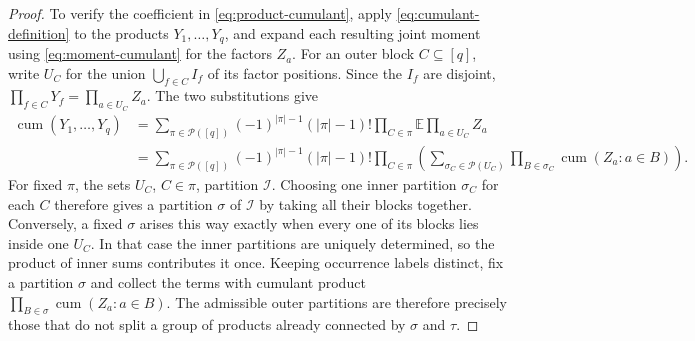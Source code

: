 \documentclass[11pt]{article}
\theoremstyle{definition}
\theoremstyle{remark}
\theoremstyle{plain}
\newcommand{\E}{\mathbb E}
\DeclareMathOperator{\cum}{cum}
\begin{document}
\begin{proof}
To verify the coefficient in
\eqref{eq:product-cumulant}, apply \eqref{eq:cumulant-definition}
to the products $Y_1,\ldots,Y_q$, and expand each resulting joint
moment using \eqref{eq:moment-cumulant} for the factors $Z_a$.
For an outer block $C\subseteq[q]$, write $U_C$ for the union
$\bigcup_{f\in C}I_f$ of its factor positions. Since the $I_f$
are disjoint, $\prod_{f\in C}Y_f=\prod_{a\in U_C}Z_a$.
The two substitutions give
\[
\begin{aligned}
 \cum(Y_1,\ldots,Y_q)
 &=\sum_{\pi\in\mathcal P([q])}(-1)^{|\pi|-1}(|\pi|-1)!
       \prod_{C\in\pi}\E\prod_{a\in U_C}Z_a\\
 &=\sum_{\pi\in\mathcal P([q])}(-1)^{|\pi|-1}(|\pi|-1)!
       \prod_{C\in\pi}\left(
          \sum_{\sigma_C\in\mathcal P(U_C)}
             \prod_{B\in\sigma_C}\cum(Z_a:a\in B)\right).
\end{aligned}
\]
For fixed $\pi$, the sets $U_C$, $C\in\pi$, partition
$\mathcal I$. Choosing one inner partition $\sigma_C$ for each
$C$ therefore gives a partition $\sigma$ of $\mathcal I$ by
taking all their blocks together. Conversely, a fixed $\sigma$
arises this way exactly when every one of its blocks lies inside
one $U_C$. In that case the inner partitions are uniquely
determined, so the product of inner sums contributes it once.
Keeping occurrence labels distinct, fix a partition $\sigma$ and
collect the terms with cumulant product
$\prod_{B\in\sigma}\cum(Z_a:a\in B)$.
The admissible outer partitions are therefore precisely those that
do not split a group of products already connected by $\sigma$
and $\tau$.


\end{proof}
\end{document}

